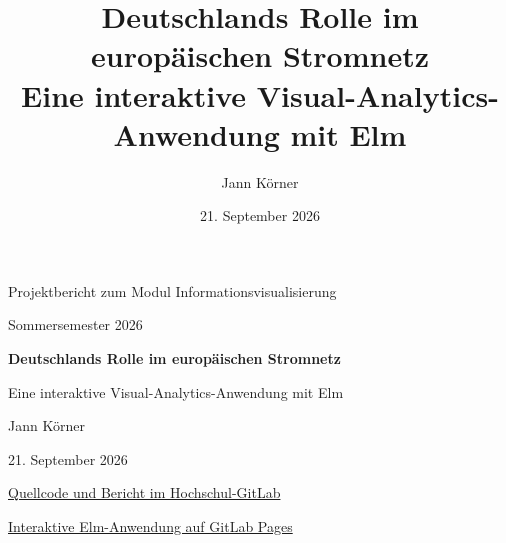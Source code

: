 \documentclass[11pt,a4paper,parskip=half]{scrartcl}
\title{Deutschlands Rolle im europäischen Stromnetz\\[0.4em]
  \large Eine interaktive Visual-Analytics-Anwendung mit Elm}
\author{Jann Körner}
\date{21. September 2026}
\newcommand{\projectlink}[1]{\href{https://gitlab-lehre.informatik.uni-halle.de/aquhr/energiechart-visualisierungsprojekt}{#1}}
\newcommand{\applicationlink}[1]{\href{https://energiechart-visualisierungsprojekt-df4c3b.gpages-lehre.informatik.uni-halle.de/}{#1}}
\begin{document}
\begin{titlepage}
  \centering
  {\sffamily\large Projektbericht zum Modul Informationsvisualisierung\par}
  \vspace{0.3cm}
  {\sffamily\large Sommersemester 2026\par}
  \vfill
  {\sffamily\bfseries\color{projectblue}\fontsize{25}{31}\selectfont
    Deutschlands Rolle im europäischen Stromnetz\par}
  \vspace{0.8cm}
  {\sffamily\Large Eine interaktive Visual-Analytics-Anwendung mit Elm\par}
  \vfill
  {\large Jann Körner\par}
  \vspace{0.35cm}
  {\large 21. September 2026\par}
  \vspace{1.2cm}
  \vfill
  {\small \projectlink{Quellcode und Bericht im Hochschul-GitLab}\par}
  \vspace{0.15cm}
  {\small \applicationlink{Interaktive Elm-Anwendung auf GitLab Pages}\par}
\end{titlepage}

\tableofcontents
\clearpage
\listoffigures
\clearpage
{}









\appendix


\clearpage


\end{document}
